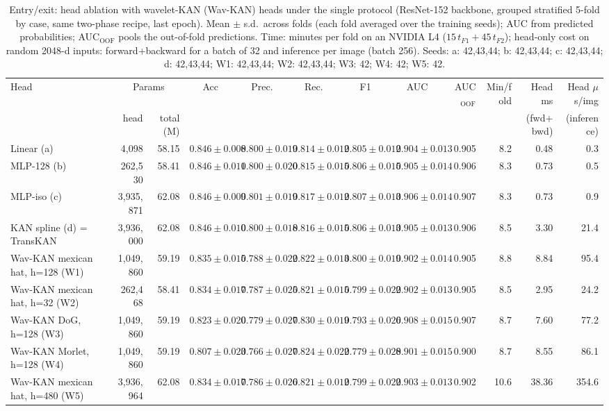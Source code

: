 \begin{table}[t]
\centering
\caption{Entry/exit: head ablation with wavelet-KAN (Wav-KAN) heads under the single protocol (ResNet-152 backbone, grouped stratified 5-fold by case, same two-phase recipe, last epoch). Mean $\pm$ s.d.\ across folds (each fold averaged over the training seeds); AUC from predicted probabilities; AUC$_{\mathrm{OOF}}$ pools the out-of-fold predictions. Time: minutes per fold on an NVIDIA L4 ($15\,t_{F1}+45\,t_{F2}$); head-only cost on random 2048-d inputs: forward+backward for a batch of 32 and inference per image (batch 256). Seeds: a: 42,43,44; b: 42,43,44; c: 42,43,44; d: 42,43,44; W1: 42,43,44; W2: 42,43,44; W3: 42; W4: 42; W5: 42.}
\label{tab:wavkan_es}
\scriptsize
\setlength{\tabcolsep}{3pt}
\begin{tabular}{lrrcccccrrrr}
\hline
Head & \multicolumn{2}{c}{Params} & Acc & Prec. & Rec. & F1 & AUC & AUC$_{\mathrm{OOF}}$ & Min/fold & Head ms & Head $\mu$s/img \\
 & head & total (M) & & & & & & & & (fwd+bwd) & (inference) \\
\hline
Linear (a) & 4{,}098 & 58.15 & $0.846 \pm 0.008$ & $0.800 \pm 0.019$ & $0.814 \pm 0.012$ & $0.805 \pm 0.012$ & $0.904 \pm 0.013$ & 0.905 & 8.2 & 0.48 & 0.3 \\
MLP-128 (b) & 262{,}530 & 58.41 & $0.846 \pm 0.011$ & $0.800 \pm 0.020$ & $0.815 \pm 0.015$ & $0.806 \pm 0.015$ & $0.905 \pm 0.014$ & 0.906 & 8.3 & 0.73 & 0.5 \\
MLP-iso (c) & 3{,}935{,}871 & 62.08 & $0.846 \pm 0.009$ & $0.801 \pm 0.019$ & $0.817 \pm 0.012$ & $0.807 \pm 0.013$ & $0.906 \pm 0.014$ & 0.907 & 8.3 & 0.73 & 0.9 \\
KAN spline (d) = TransKAN & 3{,}936{,}000 & 62.08 & $0.846 \pm 0.010$ & $0.800 \pm 0.018$ & $0.816 \pm 0.015$ & $0.806 \pm 0.013$ & $0.905 \pm 0.013$ & 0.906 & 8.5 & 3.30 & 21.4 \\
Wav-KAN mexican hat, h=128 (W1) & 1{,}049{,}860 & 59.19 & $0.835 \pm 0.015$ & $0.788 \pm 0.022$ & $0.822 \pm 0.013$ & $0.800 \pm 0.019$ & $0.902 \pm 0.014$ & 0.905 & 8.8 & 8.84 & 95.4 \\
Wav-KAN mexican hat, h=32 (W2) & 262{,}468 & 58.41 & $0.834 \pm 0.017$ & $0.787 \pm 0.025$ & $0.821 \pm 0.015$ & $0.799 \pm 0.022$ & $0.902 \pm 0.013$ & 0.905 & 8.5 & 2.95 & 24.2 \\
Wav-KAN DoG, h=128 (W3) & 1{,}049{,}860 & 59.19 & $0.823 \pm 0.020$ & $0.779 \pm 0.027$ & $0.830 \pm 0.019$ & $0.793 \pm 0.026$ & $0.908 \pm 0.015$ & 0.907 & 8.7 & 7.60 & 77.2 \\
Wav-KAN Morlet, h=128 (W4) & 1{,}049{,}860 & 59.19 & $0.807 \pm 0.023$ & $0.766 \pm 0.027$ & $0.824 \pm 0.022$ & $0.779 \pm 0.028$ & $0.901 \pm 0.015$ & 0.900 & 8.7 & 8.55 & 86.1 \\
Wav-KAN mexican hat, h=480 (W5) & 3{,}936{,}964 & 62.08 & $0.834 \pm 0.017$ & $0.786 \pm 0.026$ & $0.821 \pm 0.012$ & $0.799 \pm 0.022$ & $0.903 \pm 0.013$ & 0.902 & 10.6 & 38.36 & 354.6 \\
\hline
\end{tabular}
\end{table}

